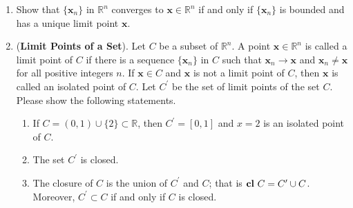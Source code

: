 \documentclass[11pt,letter,notitlepage]{article}
\theoremstyle{definition}
\DeclareMathOperator*{\cl}{\bf cl\,}
\begin{document}
\begin{exercise}
	\begin{enumerate}
		\item Show that $\{\mathbf{x}_n\}$ in $\mathbb{R}^n$ converges to $\mathbf{x}\in \mathbb{R}^n$ if and only if $\{\mathbf{x}_n\}$ is bounded and has a unique limit point $\mathbf{x}$.
		\item (\textbf{Limit Points of a Set}). Let $C$ be a subset of $\mathbb{R}^n$. A point $\mathbf{x}\in \mathbb{R}^n$ is called a limit point of $C$ if there is a sequence $\{\mathbf{x}_n\}$ in $C$ such that $\mathbf{x}_n\to \mathbf{x}$ and $\mathbf{x}_n \not=\mathbf{x}$ for all positive integers $n$. If $\mathbf{x}\in C$ and $\mathbf{x}$ is not a limit point of $C$, then $\mathbf{x}$ is called an isolated point of $C$. Let $C^\prime$ be the set of limit points of the set $C$. Please show the following statements.
		      \begin{enumerate}
			      \item If $C = (0,1)\cup\{2\}\subset \mathbb{R}$, then $C^\prime =[0,1]$ and $x=2$ is an isolated point of $C$.
			      \item  The set $C^\prime$ is closed.
			      \item  The closure of $C$ is the union of $C^\prime$ and $C$; that is $\cl C=C^\prime \cup C$. Moreover, $C^\prime \subset C$ if and only if $C$ is closed.
		      \end{enumerate}
	\end{enumerate}
\end{exercise}
\end{document}
